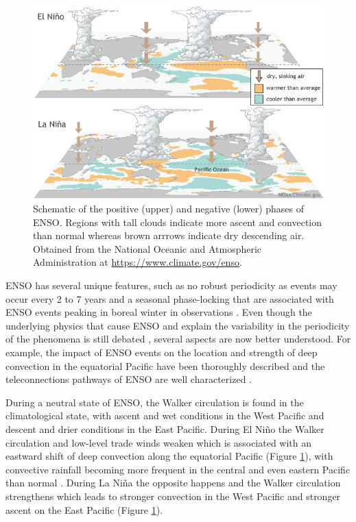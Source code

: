\begin{figure}[t!]
\centering
\includegraphics[width=\linewidth]{figures/ENSO}
\caption[El Niño Southern Oscillation and the Walker circulation]{Schematic of the positive (upper) and negative (lower) phases of ENSO. Regions with tall clouds indicate more ascent and convection than normal whereas brown arrrows indicate dry descending air. Obtained from the National Oceanic and Atmospheric Administration at \url{https://www.climate.gov/enso}. }
\label{fig:enso}
\end{figure}  

 ENSO has several unique features, such as no robust periodicity as events may occur every 2 to 7 years and a seasonal phase-locking that are associated with ENSO events peaking in boreal winter in observations \citep{wang2004}. Even though the underlying physics that cause ENSO and explain the variability in the periodicity of the phenomena is still debated \citep{wang2004,christensen2017}, several aspects are now better understood. 
For example, the impact of ENSO events on the location and strength of deep convection in the equatorial Pacific have been thoroughly described and the teleconnections pathways of ENSO are well characterized \citep{trenberth1997,neelin1998}.

During a neutral state of ENSO, the Walker circulation is found in the climatological state, with ascent and wet conditions in the West Pacific  and descent and drier conditions in the East Pacific. During El Niño the Walker circulation and low-level trade winds weaken which is associated with an eastward shift of deep convection along the equatorial Pacific (Figure \ref{fig:enso}), with convective rainfall becoming more frequent in the central and even eastern Pacific than normal \citep{neelin1998,wang2004}. During La Niña the opposite happens and the Walker circulation strengthens which leads to stronger convection in the West Pacific and stronger ascent on the East Pacific (Figure \ref{fig:enso}). 


